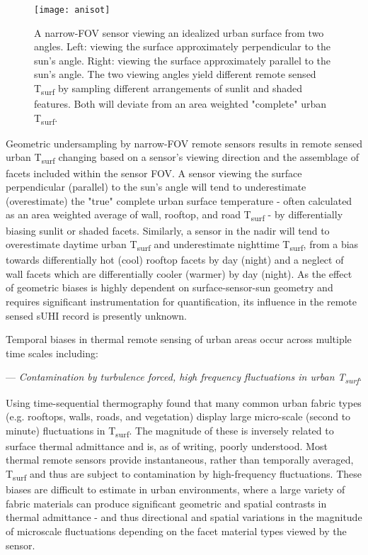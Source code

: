 \begin{bibunit}
\begin{figure}[H]
	\centering
	\texttt{[image: anisot]}
	\caption{A narrow-FOV sensor viewing an idealized urban surface from two angles. Left: viewing the surface approximately perpendicular to the sun's angle. Right: viewing the surface approximately parallel to the sun's angle. The two viewing angles yield different remote sensed T\textsubscript{surf} by sampling different arrangements of sunlit and shaded features. Both will deviate from an area weighted "complete" urban T\textsubscript{surf}.}
	\label{anisot}
\end{figure}

Geometric undersampling by narrow-FOV remote sensors results in remote sensed urban T\textsubscript{surf} changing based on a sensor's viewing direction and the assemblage of facets included within the sensor FOV. A sensor viewing the surface perpendicular (parallel) to the sun's angle will tend to underestimate (overestimate) the "true" complete urban surface temperature - often calculated as an area weighted average of wall, rooftop, and road T\textsubscript{surf} - by differentially biasing sunlit or shaded facets. Similarly, a sensor in the nadir will tend to overestimate daytime urban T\textsubscript{surf} and underestimate nighttime T\textsubscript{surf}, from a bias towards differentially hot (cool) rooftop facets by day (night) and a neglect of wall facets which are differentially cooler (warmer) by day (night). As the effect of geometric biases is highly dependent on surface-sensor-sun geometry and requires significant instrumentation for quantification, its influence in the remote sensed sUHI record is presently unknown.

Temporal biases in thermal remote sensing of urban areas occur across multiple time scales including: 

\noindent---\textit{ Contamination by turbulence forced, high frequency fluctuations in urban T\textsubscript{surf}}. 

Using time-sequential thermography \citet{Christen2012} found that many common urban fabric types (e.g. rooftops, walls, roads, and vegetation) display large micro-scale (second to minute) fluctuations in T\textsubscript{surf}. The magnitude of these is inversely related to surface thermal admittance and is, as of writing, poorly understood. Most thermal remote sensors provide instantaneous, rather than temporally averaged, T\textsubscript{surf} and thus are subject to contamination by high-frequency fluctuations. These biases are difficult to estimate in urban environments, where a large variety of fabric materials can produce significant geometric and spatial contrasts in thermal admittance - and thus directional and spatial variations in the magnitude of microscale fluctuations depending on the facet material types viewed by the sensor. 


\end{bibunit}
